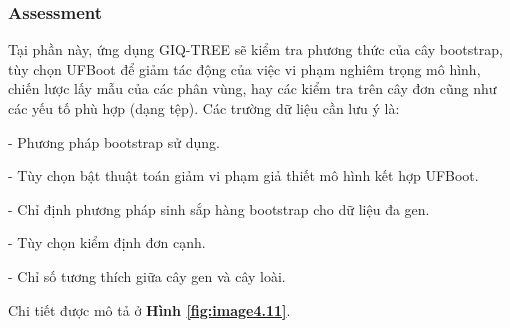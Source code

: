 \documentclass[12pt]{report}
\begin{document}
\subsubsection{Assessment}
Tại phần này, ứng dụng GIQ-TREE sẽ kiểm tra phương thức của cây bootstrap, tùy chọn UFBoot để giảm tác động của việc vi phạm nghiêm trọng mô hình, chiến lược lấy mẫu của các phân vùng, hay các kiểm tra trên cây đơn cũng như các yếu tố phù hợp (dạng tệp). Các trường dữ liệu cần lưu ý là:

- Phương pháp bootstrap sử dụng.

- Tùy chọn bật thuật toán giảm vi phạm giả thiết mô hình kết hợp UFBoot.

- Chỉ định phương pháp sinh sắp hàng bootstrap cho dữ liệu đa gen.

- Tùy chọn kiểm định đơn cạnh.

- Chỉ số tương thích giữa cây gen và cây loài.

Chi tiết được mô tả ở  \textbf{Hình \ref{fig:image4.11}}.
\end{document}
